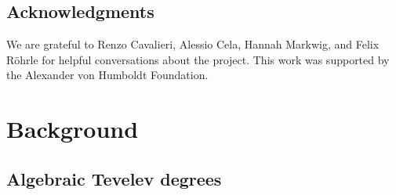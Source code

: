 \documentclass[11pt,reqno]{amsart}
\theoremstyle{definition}
\newcommand{\bP}{\mathds{P}}
\newcommand{\calM}{\mathcal{M}}
\newcommand{\Mbar}{\overline{\calM}}
\newcommand\Mgnbar[1]{\Mbar_{#1}}
\newcommand\Adm[1]{ \mathcal{ \overline{H}}_{#1}}
\newcommand{\ft}{\mathsf{f_t}}
\newcommand{\fs}{\mathsf{f_s}}
\newcommand{\Tev}{{\mathsf{Tev}}}
\begin{document}
\subsection{Acknowledgments}
We are grateful to Renzo Cavalieri, Alessio Cela, Hannah Markwig, and Felix Röhrle for helpful conversations about the project. This work was supported by the Alexander von Humboldt Foundation.

\section{Background}

\subsection{Algebraic Tevelev degrees}


\end{document}
